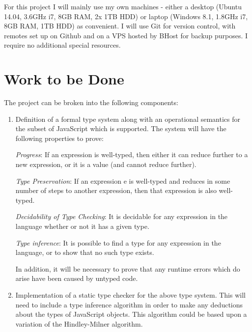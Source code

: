 \documentclass{article}
\begin{document}
		For this project I will mainly use my own machines - either a desktop (Ubuntu 14.04, 3.6GHz i7, 8GB RAM, 2x 1TB HDD) or laptop (Windows 8.1, 1.8GHz i7, 8GB RAM, 1TB HDD) as convenient. I will use Git for version control, with remotes set up on Github and on a VPS hosted by BHost for backup purposes. I require no additional special resources.
				
	\section{Work to be Done}\label{work-to-be-done}

		The project can be broken into the following components:
		\begin{enumerate}\def\labelenumi{\arabic{enumi}.}
		 \item Definition of a formal type system along with an operational semantics for the subset of JavaScript which is supported. The system will have the following properties to prove:   
			
			\emph{Progress}: If an expression is well-typed, then either it can reduce further to a new expression, or it is a value (and cannot reduce further). 

			\emph{Type Preservation}: If an expression e is well-typed and reduces in some number of steps to another expression, then that expression is also well-typed.
			
			\emph{Decidability of Type Checking}: It is decidable for any expression in the language whether or not it has a given type.
			
			\emph{Type inference}: It is possible to find a type for any expression in the language, or to show that no such type exists.

		 In addition, it will be necessary to prove that any runtime errors which do arise have been caused by untyped code.
		 
		 \item Implementation of a static type checker for the above type system. This will need to include a type inference algorithm in order to make any deductions about the types of JavaScript objects. This algorithm could be based upon a variation of the Hindley-Milner algorithm.
		 

\end{enumerate}
\end{document}
